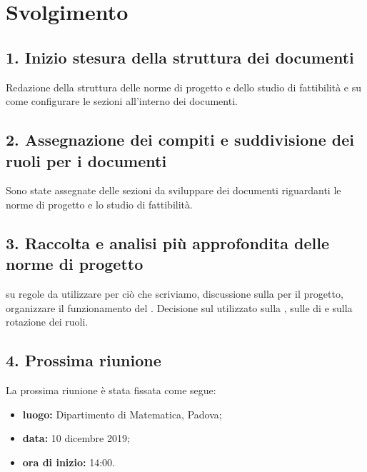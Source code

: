 \newpage
\section*{Svolgimento}

\subsection*{1. Inizio stesura della struttura dei documenti }

Redazione della struttura delle norme di progetto e dello studio di fattibilità e su come configurare le sezioni all'interno dei documenti.

\subsection*{2. Assegnazione dei compiti e suddivisione dei ruoli per i documenti }

Sono state assegnate delle sezioni da sviluppare dei documenti riguardanti le norme di progetto e lo studio di fattibilità.

\subsection*{3. Raccolta e analisi più approfondita delle norme di progetto }


 su regole da utilizzare per ciò che scriviamo, discussione sulla  per il progetto, organizzare il funzionamento del . Decisione sul  utilizzato sulla , sulle  di  e sulla rotazione dei ruoli.

\subsection*{4. Prossima riunione}

La prossima riunione è stata fissata come segue:
\begin{itemize}
	\item \textbf{luogo:} Dipartimento di Matematica, Padova;
	\item \textbf{data:} 10 dicembre 2019;
	\item \textbf{ora di inizio:} 14:00.
\end{itemize}
